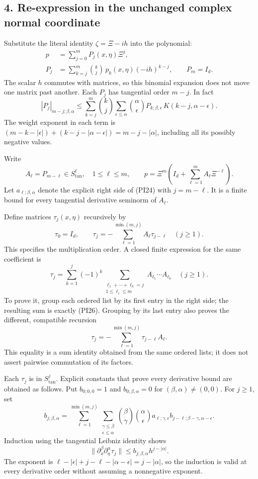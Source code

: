 \documentclass[
  11pt,
]{article}
\begin{document}
\subsection{4. Re-expression in the unchanged complex normal
coordinate}\label{re-expression-in-the-unchanged-complex-normal-coordinate}

Substitute the literal identity \(\zeta=\Xi-ih\) into the polynomial: \[
 \begin{split}
 p&=\sum_{j=0}^{m}P_j(x,\eta)\Xi^j,\\
 P_j&=\sum_{k=j}^{m}\binom kj\,p_k(x,\eta)(-ih)^{k-j},\qquad
 P_m=I_d.
 \end{split}
 \tag{PI23}
\] The scalar \(h\) commutes with matrices, so this binomial expansion
does not move one matrix past another. Each \(P_j\) has tangential order
\(m-j\). In fact \[
 |P_j|_{m-j;\beta,\alpha}
 \leq
 \sum_{k=j}^{m}\binom kj
 \sum_{\epsilon\leq\alpha}\binom\alpha\epsilon
 P_{k;\beta,\epsilon}\,K(k-j,\alpha-\epsilon).
 \tag{PI24}
\] The weight exponent in each term is
\((m-k-|\epsilon|)+(k-j-|\alpha-\epsilon|)=m-j-|\alpha|\), including all
its possibly negative values.

Write \[
 A_\ell=P_{m-\ell}\in S^\ell_{\mathrm{tan}},\quad1\leq\ell\leq m,\qquad
 p=\Xi^m\left(I_d+\sum_{\ell=1}^{m}A_\ell\Xi^{-\ell}\right).
 \tag{PI25}
\] Let \(a_{\ell;\beta,\alpha}\) denote the explicit right side of
(PI24) with \(j=m-\ell\). It is a finite bound for every tangential
derivative seminorm of \(A_\ell\).

Define matrices \(\tau_j(x,\eta)\) recursively by \[
 \tau_0=I_d,\qquad
 \tau_j=-\sum_{\ell=1}^{\min(m,j)}A_\ell\tau_{j-\ell}
 \quad(j\geq1).
 \tag{PI26}
\] This specifies the multiplication order. A closed finite expression
for the same coefficient is \[
 \tau_j=
 \sum_{k=1}^{j}(-1)^k
 \sum_{\substack{\ell_1+\cdots+\ell_k=j\\1\leq\ell_i\leq m}}
 A_{\ell_1}\cdots A_{\ell_k}\quad(j\geq1).
 \tag{PI27}
\] To prove it, group each ordered list by its first entry in the right
side; the resulting sum is exactly (PI26). Grouping by its last entry
also proves the different, compatible recursion \[
 \tau_j=-\sum_{\ell=1}^{\min(m,j)}\tau_{j-\ell}A_\ell.
 \tag{PI28}
\] This equality is a sum identity obtained from the same ordered lists;
it does not assert pairwise commutation of its factors.

Each \(\tau_j\) is in \(S^j_{\mathrm{tan}}\). Explicit constants that
prove every derivative bound are obtained as follows. Put
\(b_{0;0,0}=1\) and \(b_{0;\beta,\alpha}=0\) for
\((\beta,\alpha)\ne(0,0)\). For \(j\geq1\), set \[
 b_{j;\beta,\alpha}=
 \sum_{\ell=1}^{\min(m,j)}
 \sum_{\substack{\gamma\leq\beta\\\epsilon\leq\alpha}}
 \binom\beta\gamma\binom\alpha\epsilon
 a_{\ell;\gamma,\epsilon}
 b_{j-\ell;\beta-\gamma,\alpha-\epsilon}.
 \tag{PI29}
\] Induction using the tangential Leibniz identity shows \[
 \|\partial_x^\beta\partial_\eta^\alpha\tau_j\|
 \leq b_{j;\beta,\alpha}h^{j-|\alpha|}.
 \tag{PI30}
\] The exponent is
\(\ell-|\epsilon|+j-\ell-|\alpha-\epsilon|=j-|\alpha|\), so the
induction is valid at every derivative order without assuming a
nonnegative exponent.
\end{document}
